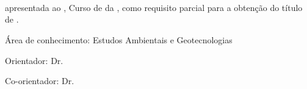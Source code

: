 \begin{folharosto}

\begin{center}
\theauthor
\end{center}
\ \\
\ \\
\ \\
\ \\
\ \\
\begin{spacing}{2}
   \begin{center}
   {\LARGE {\bf \thetitle}}
   \end{center}
\end{spacing}
\ \\
\ \\
\ \\
\begin{flushright}

   \begin{list}{}{
      \setlength{\leftmargin}{4.5cm}
      \setlength{\rightmargin}{0cm}
      \setlength{\labelwidth}{0pt}
      \setlength{\labelsep}{\leftmargin}}

      \item \thetypework apresentada ao \thefaculty, Curso de \thecourse
      da \theuniversity, como requisito parcial para a obtenção do
      título de {\bf \thedegreetitle}.

    \begin{list}{}{
      \setlength{\leftmargin}{0cm}
      \setlength{\rightmargin}{0cm}
      \setlength{\labelwidth}{0pt}
      \setlength{\labelsep}{\leftmargin}}

      \item Área de conhecimento: Estudos Ambientais e Geotecnologias

      \item Orientador: Dr. \theadvisor
      \newline \hspace*{2.1cm}  {\footnotesize {\it \theuniversity}}
      
      \ifcoor
          \item Co-orientador: Dr. \thecoadvisor
          \newline \hspace*{2.1cm}  {\footnotesize \emph{\ppgmcooruniv}}
      \fi
      \end{list}
   \end{list}


\end{flushright}
\end{folharosto}
